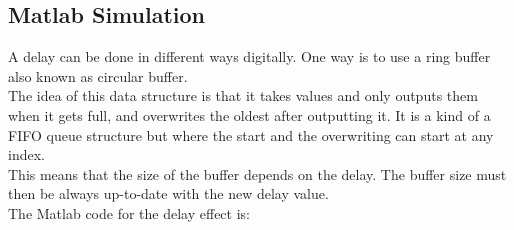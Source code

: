 \subsection{Matlab Simulation}

A delay can be done in different ways digitally. One way is to use a ring buffer also known as circular buffer. \\
The idea of this data structure is that it takes values and only outputs them when it gets full, and overwrites the oldest after outputting it. It is a kind of a FIFO queue structure but where the start and the overwriting can start at any index. \\
This means that the size of the buffer depends on the delay.  The buffer size must then be always up-to-date with the new delay value. \\ 


The Matlab code for the delay effect is:

%
%
%
%
%
%
%
%
%
%
%
%
